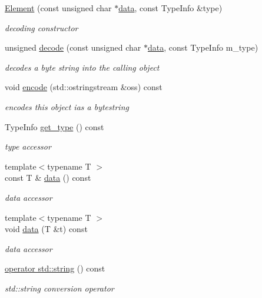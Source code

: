 \begin{DoxyCompactItemize}
\item 
\hyperlink{classbson_1_1_element_ad6c099da832f6ef01f9b4fec9951a682}{Element} (const unsigned char $\ast$\hyperlink{classbson_1_1_element_a5a9f2e3fa927fb283adf8c47b39495e1}{data}, const Type\+Info \&type)
\begin{DoxyCompactList}\small\item\em decoding constructor \end{DoxyCompactList}\item 
unsigned \hyperlink{classbson_1_1_element_a5f0107bf841eab384f78897d6022eab2}{decode} (const unsigned char $\ast$\hyperlink{classbson_1_1_element_a5a9f2e3fa927fb283adf8c47b39495e1}{data}, const Type\+Info m\+\_\+type)
\begin{DoxyCompactList}\small\item\em decodes a byte string into the calling object \end{DoxyCompactList}\item 
void \hyperlink{classbson_1_1_element_a4bd94ab22d7f957bd076c5396c09cc2b}{encode} (std\+::ostringstream \&oss) const 
\begin{DoxyCompactList}\small\item\em encodes this object ias a bytestring \end{DoxyCompactList}\item 
Type\+Info \hyperlink{classbson_1_1_element_a7f4b3a920d8680889e03efb1f761c2a8}{get\+\_\+type} () const 
\begin{DoxyCompactList}\small\item\em type accessor \end{DoxyCompactList}\item 
{\footnotesize template$<$typename T $>$ }\\const T \& \hyperlink{classbson_1_1_element_a5a9f2e3fa927fb283adf8c47b39495e1}{data} () const 
\begin{DoxyCompactList}\small\item\em data accessor \end{DoxyCompactList}\item 
{\footnotesize template$<$typename T $>$ }\\void \hyperlink{classbson_1_1_element_a163cea2cdc4dd3d922359df32b6fd953}{data} (T \&t) const 
\begin{DoxyCompactList}\small\item\em data accessor \end{DoxyCompactList}\item 
\hyperlink{classbson_1_1_element_a15e2009787e1e18c26d0de42a93050cc}{operator std\+::string} () const 
\begin{DoxyCompactList}\small\item\em std\+::string conversion operator \end{DoxyCompactList}\end{DoxyCompactItemize}
